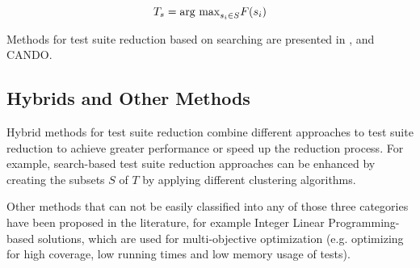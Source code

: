 $$T_s=\hbox{arg max}_{s_i \in S} F(s_i)$$

Methods for test suite reduction based on searching are presented in
\cite{coutinho2013test}, and CANDO.

\subsection{Hybrids and Other Methods}

Hybrid methods for test suite reduction combine different approaches
to test suite reduction to achieve greater performance or speed up
the reduction process. For example, search-based test suite reduction
approaches can be enhanced by creating the subsets $S$ of $T$ by applying
different clustering algorithms.

Other methods that can not be easily classified into any of those three
categories have been proposed in the literature, for example Integer
Linear Programming-based solutions, which are used for multi-objective
optimization (e.g. optimizing for high coverage, low running times and
low memory usage of tests). %
